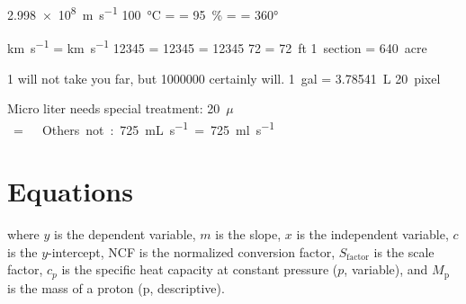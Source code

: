 \documentclass[ms-thesis,mathdesign,chpterrefs,showgrid]{ndsu-thesis-tagged}%
\begin{document}
\noindent\hspace{1ex} 
\qty{2.998e8}{\m\per\s} \hspace{2ex} 
\qty{100}{\degreeCelsius} =  =  \hspace{2ex} 
\qty{95}{\percent} =  =   \hspace{2ex} \ang{360} 

\noindent\hspace{1ex} 
\unit{\kilo\meter\per\second} = \unit{\km\per\s}  \hspace{2ex} 
\num{12345} = \num[group-separator = \ ]{12345} = \num[group-separator=]{12345}  \hspace{2ex} 
\qty{72}{\ft} = \qty{72}{ft}   \hspace{2ex} 
\qty{1}{section} = \qty{640}{acre}

\noindent\hspace{1ex} 
\unit{\USD}1 will not take you far, but \unit{\USD}\num{1000000} certainly will.  \hspace{2ex} 
\qty{1}{gal} = \qty[group-separator=]{3.78541}{\liter} \hspace{2ex} 
\qty{20}{pixel}

\noindent\hspace{1ex} 
Micro liter needs special treatment: \qty[mode = text]{20}{$\mu$\liter} = .   \hspace{2ex} Others not: 
\qty{725}{\milli\liter\per\second} = \qty{725}{\ml\per\s}

\section{Equations}
\repText[11]


\noindent where $y$ is the dependent variable, $m$ is the slope, $x$ is the independent variable, $c$ is the $y$-intercept, NCF is the normalized conversion factor, $S_\text{factor}$ is the scale factor, $c_p$ is the specific heat capacity at constant pressure ($p$, variable), and $M_\text{p}$ is the mass of a proton (p, descriptive). 
\end{document}
